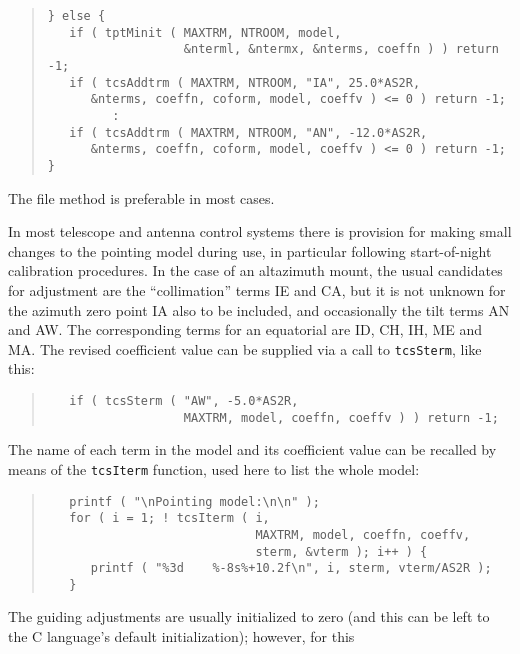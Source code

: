 \documentclass[12pt,fleqn,twoside]{article}
\renewcommand{\_}{{\tt\char'137}}     %
\begin{document}
\begin{quote}
\begin{small}
\begin{verbatim}
} else {
   if ( tptMinit ( MAXTRM, NTROOM, model,
                   &nterml, &ntermx, &nterms, coeffn ) ) return -1;
   if ( tcsAddtrm ( MAXTRM, NTROOM, "IA", 25.0*AS2R,
      &nterms, coeffn, coform, model, coeffv ) <= 0 ) return -1;
         :
   if ( tcsAddtrm ( MAXTRM, NTROOM, "AN", -12.0*AS2R,
      &nterms, coeffn, coform, model, coeffv ) <= 0 ) return -1;
}
\end{verbatim}\end{small}
\end{quote}
The file method is preferable in most cases.

In most telescope and antenna control systems there is provision
for making small changes to the pointing model during use, in
particular following start-of-night calibration procedures.  In
the case of an altazimuth mount, the usual candidates for
adjustment are the ``collimation'' terms IE and CA, but it is
not unknown for the azimuth zero point IA also to be included, and
occasionally the tilt terms AN and AW.  The corresponding terms for
an equatorial are ID, CH, IH, ME and MA.  The revised
coefficient value can be supplied via a call to {\tt tcsSterm},
like this:
\begin{quote}
\begin{small}
\begin{verbatim}
   if ( tcsSterm ( "AW", -5.0*AS2R,
                   MAXTRM, model, coeffn, coeffv ) ) return -1;
\end{verbatim}\end{small}
\end{quote}
The name of each term in the model and its coefficient value
can be recalled by means of the {\tt tcsIterm} function,
used here to list the whole model:
\begin{quote}
\begin{small}
\begin{verbatim}
   printf ( "\nPointing model:\n\n" );
   for ( i = 1; ! tcsIterm ( i,
                             MAXTRM, model, coeffn, coeffv,
                             sterm, &vterm ); i++ ) {
      printf ( "%3d    %-8s%+10.2f\n", i, sterm, vterm/AS2R );
   }
\end{verbatim}\end{small}
\end{quote}
The guiding adjustments are usually initialized to zero (and this can be
left to the C language's default initialization);  however, for this
\end{document}

